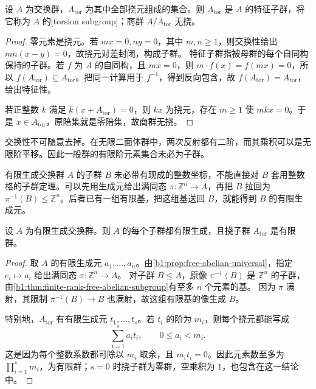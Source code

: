 \begin{proposition}[挠子群与无挠商群]\label{b1:prop:torsion-quotient}
	设 \(A\) 为交换群，\(A_{\mathrm{tor}}\) 为其中全部挠元组成的集合。则 \(A_{\mathrm{tor}}\) 是 \(A\) 的特征子群，将它称为 \(A\) 的[torsion subgroup]；商群 \(A/A_{\mathrm{tor}}\) 无挠。
\end{proposition}

\begin{proof}
	零元素是挠元。若 \(mx=0,ny=0\)，其中 \(m,n\ge1\)，则交换性给出 \(mn(x-y)=0\)，故挠元对差封闭，构成子群。 特征子群指被母群的每个自同构保持的子群。若 \(f\) 为 \(A\) 的自同构，且 \(mx=0\)，则 \(m\cdot f(x)=f(mx)=0\)，所以 \(f(A_{\mathrm{tor}})\subseteq A_{\mathrm{tor}}\)。把同一计算用于 \(f^{-1}\)，得到反向包含，故 \(f(A_{\mathrm{tor}})=A_{\mathrm{tor}}\)，给出特征性。

	若正整数 \(k\) 满足 \(k(x+A_{\mathrm{tor}})=0\)，则 \(kx\) 为挠元，存在 \(m\ge1\) 使 \(mkx=0\)。于是 \(x\in A_{\mathrm{tor}}\)，原陪集就是零陪集，故商群无挠。
\end{proof}

交换性不可随意去掉。在无限二面体群中，两次反射都有二阶，而其乘积可以是无限阶平移。因此一般群的有限阶元素集合未必为子群。

\ProseParagraphBreak
有限生成交换群 \(A\) 的子群 \(B\) 未必带有现成的整数坐标，不能直接对 \(B\) 套用整数格的子群定理。可以先用生成元给出满同态 \(\pi:\mathbb Z^n\to A\)，再把 \(B\) 拉回为 \(\pi^{-1}(B)\leq\mathbb Z^n\)。后者已有一组有限基，把这组基送回 \(B\)，就能得到 \(B\) 的有限生成元。

\begin{proposition}[有限生成交换群的子群]\label{b1:prop:fg-abelian-subgroups}
	设 \(A\) 为有限生成交换群。则 \(A\) 的每个子群都有限生成，且挠子群 \(A_{\mathrm{tor}}\) 是有限群。
\end{proposition}

\begin{proof}
	取 \(A\) 的有限生成元 \(a_1,\ldots,a_n\)。由\cref{b1:prop:free-abelian-universal}，指定 \(e_i\mapsto a_i\) 给出满同态 \(\pi:\mathbb Z^n\to A\)。 对子群 \(B\le A\)，原像 \(\pi^{-1}(B)\) 是 \(\mathbb Z^n\) 的子群，由\cref{b1:thm:finite-rank-free-abelian-subgroup}有至多 \(n\) 个元素的基。 因为 \(\pi\) 满射，其限制 \(\pi^{-1}(B)\to B\) 也满射，故这组有限基的像生成 \(B\)。

	特别地，\(A_{\mathrm{tor}}\) 有有限生成元 \(t_1,\ldots,t_s\)。若 \(t_i\) 的阶为 \(m_i\)，则每个挠元都能写成
	\[
		\sum_{i=1}^s a_i t_i,\qquad 0\le a_i<m_i.
	\]
	这是因为每个整数系数都可除以 \(m_i\) 取余，且 \(m_it_i=0\)。因此元素数至多为 \(\prod_{i=1}^s m_i\)，为有限群；\(s=0\) 时挠子群为零群，空乘积为 \(1\)，也包含在这一结论中。
\end{proof}

